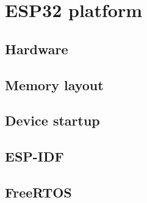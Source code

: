 \chapter{ESP32 platform}

\section{Hardware}
\section{Memory layout}
\section{Device startup}
\section{ESP-IDF}
\section{FreeRTOS}
